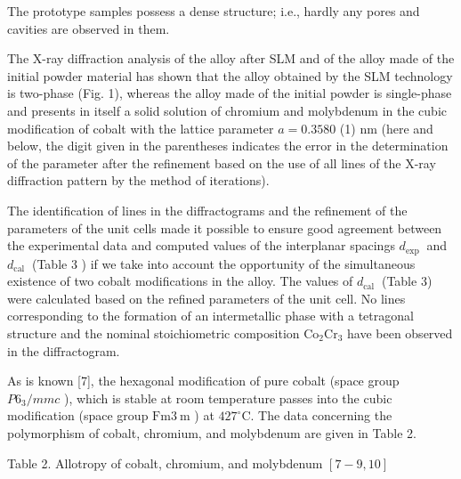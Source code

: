\documentclass[10pt]{article}
\begin{document}
The prototype samples possess a dense structure; i.e., hardly any pores and cavities are observed in them.

The X-ray diffraction analysis of the alloy after SLM and of the alloy made of the initial powder material has shown that the alloy obtained by the SLM technology is two-phase (Fig. 1), whereas the alloy made of the initial powder is single-phase and presents in itself a solid solution of chromium and molybdenum in the cubic modification of cobalt with the lattice parameter $a=0.3580$ (1) $\mathrm{nm}$ (here and below, the digit given in the parentheses indicates the error in the determination of the parameter after the refinement based on the use of all lines of the X-ray diffraction pattern by the method of iterations).

The identification of lines in the diffractograms and the refinement of the parameters of the unit cells made it possible to ensure good agreement between the experimental data and computed values of the interplanar spacings $d_{\text {exp }}$ and $d_{\text {cal }}$ (Table 3 ) if we take into account the opportunity of the simultaneous existence of two cobalt modifications in the alloy. The values of $d_{\text {cal }}$ (Table 3) were calculated based on the refined parameters of the unit cell. No lines corresponding to the formation of an intermetallic phase with a tetragonal structure and the nominal stoichiometric composition $\mathrm{Co}_{2} \mathrm{Cr}_{3}$ have been observed in the diffractogram.

As is known [7], the hexagonal modification of pure cobalt (space group $P 6_{3} / m m c$ ), which is stable at room temperature passes into the cubic modification (space group $\mathrm{Fm} 3 \mathrm{~m}$ ) at $427^{\circ} \mathrm{C}$. The data concerning the polymorphism of cobalt, chromium, and molybdenum are given in Table 2.

Table 2. Allotropy of cobalt, chromium, and molybdenum $[7-9,10]$
\end{document}

